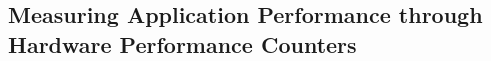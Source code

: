 

\subsection{Measuring Application Performance through Hardware Performance Counters} \label{ch4:bg:subsec:Applications_vs_perf}

